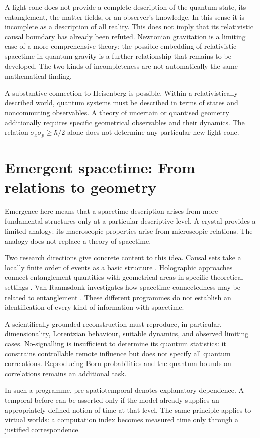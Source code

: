 A light cone does not provide a complete description of the quantum state, its entanglement, the matter fields, or an observer's knowledge. In this sense it is incomplete as a description of all reality. This does not imply that its relativistic causal boundary has already been refuted. Newtonian gravitation is a limiting case of a more comprehensive theory; the possible embedding of relativistic spacetime in quantum gravity is a further relationship that remains to be developed. The two kinds of incompleteness are not automatically the same mathematical finding.

A substantive connection to Heisenberg is possible. Within a relativistically described world, quantum systems must be described in terms of states and noncommuting observables. A theory of uncertain or quantised geometry additionally requires specific geometrical observables and their dynamics. The relation \(\sigma_x\sigma_p\geq\hbar/2\) alone does not determine any particular new light cone.

\section{Emergent spacetime: From relations to geometry}\label{en:sec8}
Emergence here means that a spacetime description arises from more fundamental structures only at a particular descriptive level. A crystal provides a limited analogy: its macroscopic properties arise from microscopic relations. The analogy does not replace a theory of spacetime.

Two research directions give concrete content to this idea. Causal sets take a locally finite order of events as a basic structure \cite{14}. Holographic approaches connect entanglement quantities with geometrical areas in specific theoretical settings \cite{12}. Van Raamsdonk investigates how spacetime connectedness may be related to entanglement \cite{13}. These different programmes do not establish an identification of every kind of information with spacetime.

A scientifically grounded reconstruction must reproduce, in particular, dimensionality, Lorentzian behaviour, suitable dynamics, and observed limiting cases. No-signalling is insufficient to determine its quantum statistics: it constrains controllable remote influence but does not specify all quantum correlations. Reproducing Born probabilities and the quantum bounds on correlations remains an additional task.

In such a programme, pre-spatiotemporal denotes explanatory dependence. A temporal before can be asserted only if the model already supplies an appropriately defined notion of time at that level. The same principle applies to virtual worlds: a computation index becomes measured time only through a justified correspondence.

